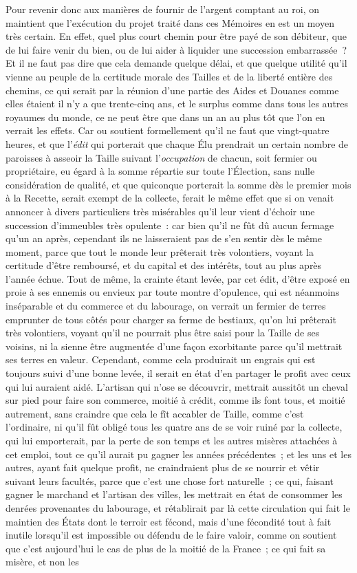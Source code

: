 \documentclass[french,twoside]{book} %
\begin{document}
Pour revenir donc aux manières de fournir de l’argent comptant au roi, on maintient que l’exécution du projet traité dans ces Mémoires en est un moyen très certain. En effet, quel plus court chemin pour être payé de son débiteur, que de lui faire venir du bien, ou de lui aider à liquider une succession embarrassée ? Et il ne faut pas dire que cela demande quelque délai, et que quelque utilité qu’il vienne au peuple de la certitude morale des Tailles et de la liberté entière des chemins, ce qui serait par la réunion d’une partie des Aides et Douanes comme elles étaient il n’y a que trente-cinq ans, et le surplus comme dans tous les autres royaumes du monde, ce ne peut être que dans un an au plus tôt que l’on en verrait les effets. Car ou soutient formellement qu’il ne faut que vingt-quatre heures, et que l’{\itshape édit} qui porterait que chaque Élu prendrait un certain nombre de paroisses à asseoir la Taille suivant l’{\itshape occupation} de chacun, soit fermier ou propriétaire, eu égard à la somme répartie sur toute l’Élection, sans nulle considération de qualité, et que quiconque porterait la somme dès le premier mois à la Recette, serait exempt de la collecte, ferait le même effet que si on venait annoncer à divers particuliers très misérables qu’il leur vient d’échoir une succession d’immeubles très opulente : car bien qu’il ne fût dû aucun fermage qu’un an après, cependant ils ne laisseraient pas de s’en sentir dès le même moment, parce que tout le monde leur prêterait très volontiers, voyant la certitude d’être remboursé, et du capital et des intérêts, tout au plus après l’année échue. Tout de même, la crainte étant levée, par cet édit, d’être exposé en proie à ses ennemis ou envieux par toute montre d’opulence, qui est néanmoins inséparable et du commerce et du labourage, on verrait un fermier de terres emprunter de tous côtés pour charger sa ferme de bestiaux, qu’on lui prêterait très volontiers, voyant qu’il ne pourrait plus être saisi pour la Taille de ses voisins, ni la sienne être augmentée d’une façon exorbitante parce qu’il mettrait ses terres en valeur. Cependant, comme cela produirait un engrais qui est toujours suivi d’une bonne levée, il serait en état d’en partager le profit avec ceux qui lui auraient aidé. L’artisan qui n’ose se découvrir, mettrait aussitôt un cheval sur pied pour faire son commerce, moitié à crédit, comme ils font tous, et moitié autrement, sans craindre que cela le fît accabler de Taille, comme c’est l’ordinaire, ni qu’il fût obligé tous les quatre ans de se voir ruiné par la collecte, qui lui emporterait, par la perte de son temps et les autres misères attachées à cet emploi, tout ce qu’il aurait pu gagner les années précédentes ; et les uns et les autres, ayant fait quelque profit, ne craindraient plus de se nourrir et vêtir suivant leurs facultés, parce que c’est une chose fort naturelle ; ce qui, faisant gagner le marchand et l’artisan des villes, les mettrait en état de consommer les denrées provenantes du labourage, et rétablirait par là cette circulation qui fait le maintien des États dont le terroir est fécond, mais d’une fécondité tout à fait inutile lorsqu’il est impossible ou défendu de le faire valoir, comme on soutient que c’est aujourd’hui le cas de plus de la moitié de la France ; ce qui fait sa misère, et non les 
\end{document}

